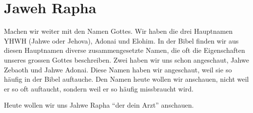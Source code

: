 \section{Jaweh Rapha}
\begin{otsblock}[Gottesnamen]
    Machen wir weiter mit den Namen Gottes. Wir haben die drei Hauptnamen YHWH (Jahwe oder Jehova), Adonai und Elohim. In der Bibel finden wir aus diesen Hauptnamen diverse zusammengesetzte Namen, die oft die Eigenschaften unseres grossen Gottes beschreiben. Zwei haben wir uns schon angeschaut, Jahwe Zebaoth und Jahwe Adonai. Diese Namen haben wir angeschaut, weil sie so häufig in der Bibel auftauche. Den Namen heute wollen wir anschauen, nicht weil er so oft auftaucht, sondern weil er so häufig missbraucht wird. 

    Heute wollen wir uns Jahwe Rapha \enquote{der \herr{} dein Arzt} anschauen.  
    \end{otsblock}
